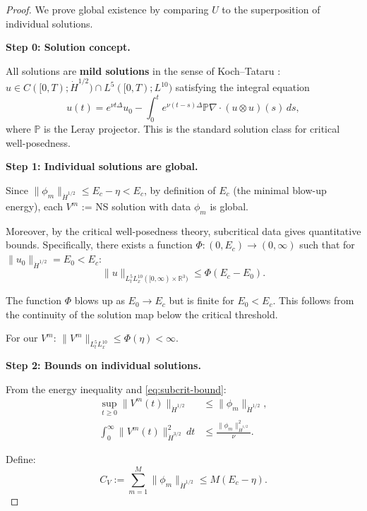 \documentclass[11pt]{article}
\theoremstyle{definition}
\newcommand{\R}{\mathbb{R}}
\begin{document}
\begin{proof}
We prove global existence by comparing $U$ to the superposition of individual solutions.

\textbf{Step 0: Solution concept.}

All solutions are \textbf{mild solutions} in the sense of Koch--Tataru \cite{KT}: $u \in C([0,T); \dot{H}^{1/2}) \cap L^5([0,T); L^{10})$ satisfying the integral equation
\begin{equation}
u(t) = e^{\nu t \Delta} u_0 - \int_0^t e^{\nu(t-s)\Delta} \mathbb{P} \nabla \cdot (u \otimes u)(s) \, ds,
\end{equation}
where $\mathbb{P}$ is the Leray projector. This is the standard solution class for critical well-posedness.

\textbf{Step 1: Individual solutions are global.}

Since $\|\phi_m\|_{\dot{H}^{1/2}} \leq E_c - \eta < E_c$, by definition of $E_c$ (the minimal blow-up energy), each $V^m$ := NS solution with data $\phi_m$ is global.

Moreover, by the critical well-posedness theory, subcritical data gives quantitative bounds. Specifically, there exists a function $\Phi: (0, E_c) \to (0, \infty)$ such that for $\|u_0\|_{\dot{H}^{1/2}} = E_0 < E_c$:
\begin{equation}\label{eq:subcrit-bound}
\|u\|_{L^5_t L^{10}_x([0,\infty) \times \R^3)} \leq \Phi(E_c - E_0).
\end{equation}

The function $\Phi$ blows up as $E_0 \to E_c$ but is finite for $E_0 < E_c$. This follows from the continuity of the solution map below the critical threshold.

For our $V^m$: $\|V^m\|_{L^5_t L^{10}_x} \leq \Phi(\eta) < \infty$.

\textbf{Step 2: Bounds on individual solutions.}

From the energy inequality and \eqref{eq:subcrit-bound}:
\begin{align}
\sup_{t \geq 0} \|V^m(t)\|_{\dot{H}^{1/2}} &\leq \|\phi_m\|_{\dot{H}^{1/2}}, \label{eq:Vm-sup}\\
\int_0^\infty \|V^m(t)\|_{\dot{H}^{3/2}}^2 \, dt &\leq \frac{\|\phi_m\|_{\dot{H}^{1/2}}^2}{\nu}. \label{eq:Vm-diss}
\end{align}

Define:
\begin{equation}
C_V := \sum_{m=1}^M \|\phi_m\|_{\dot{H}^{1/2}} \leq M(E_c - \eta).
\end{equation}


\end{proof}
\end{document}
